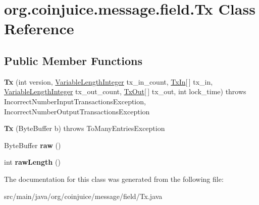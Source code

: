 \hypertarget{classorg_1_1coinjuice_1_1message_1_1field_1_1_tx}{\section{org.\-coinjuice.\-message.\-field.\-Tx Class Reference}
\label{classorg_1_1coinjuice_1_1message_1_1field_1_1_tx}
}
\subsection*{Public Member Functions}
\begin{DoxyCompactItemize}
\item 
\hypertarget{classorg_1_1coinjuice_1_1message_1_1field_1_1_tx_a253590122de52cfa39374e3e7d0d7fbe}{{\bfseries Tx} (int version, \hyperlink{classorg_1_1coinjuice_1_1message_1_1field_1_1_variable_length_integer}{Variable\-Length\-Integer} tx\-\_\-in\-\_\-count, \hyperlink{classorg_1_1coinjuice_1_1message_1_1field_1_1_tx_in}{Tx\-In}\mbox{[}$\,$\mbox{]} tx\-\_\-in, \hyperlink{classorg_1_1coinjuice_1_1message_1_1field_1_1_variable_length_integer}{Variable\-Length\-Integer} tx\-\_\-out\-\_\-count, \hyperlink{classorg_1_1coinjuice_1_1message_1_1field_1_1_tx_out}{Tx\-Out}\mbox{[}$\,$\mbox{]} tx\-\_\-out, int lock\-\_\-time)  throws Incorrect\-Number\-Input\-Transactions\-Exception, Incorrect\-Number\-Output\-Transactions\-Exception }\label{classorg_1_1coinjuice_1_1message_1_1field_1_1_tx_a253590122de52cfa39374e3e7d0d7fbe}

\item 
\hypertarget{classorg_1_1coinjuice_1_1message_1_1field_1_1_tx_aa8a8047d9c7ad9c1ce95f7f3d8d58f2b}{{\bfseries Tx} (Byte\-Buffer b)  throws To\-Many\-Entries\-Exception }\label{classorg_1_1coinjuice_1_1message_1_1field_1_1_tx_aa8a8047d9c7ad9c1ce95f7f3d8d58f2b}

\item 
\hypertarget{classorg_1_1coinjuice_1_1message_1_1field_1_1_tx_a41d80eeb8d8432f4feb42cdb8858641c}{Byte\-Buffer {\bfseries raw} ()}\label{classorg_1_1coinjuice_1_1message_1_1field_1_1_tx_a41d80eeb8d8432f4feb42cdb8858641c}

\item 
\hypertarget{classorg_1_1coinjuice_1_1message_1_1field_1_1_tx_aae66c176398800e841229178a4c63588}{int {\bfseries raw\-Length} ()}\label{classorg_1_1coinjuice_1_1message_1_1field_1_1_tx_aae66c176398800e841229178a4c63588}

\end{DoxyCompactItemize}


The documentation for this class was generated from the following file\-:\begin{DoxyCompactItemize}
\item 
src/main/java/org/coinjuice/message/field/Tx.\-java\end{DoxyCompactItemize}
